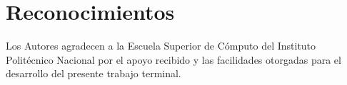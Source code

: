 \documentclass[journal]{IEEEtran}
\begin{document}
%
%


\section*{Reconocimientos}
Los Autores agradecen a la Escuela Superior de Cómputo
del Instituto Politécnico Nacional por el apoyo recibido y las
facilidades otorgadas para el desarrollo del presente trabajo
terminal. 


\ifCLASSOPTIONcaptionsoff
  \newpage
\fi




\end{document}
